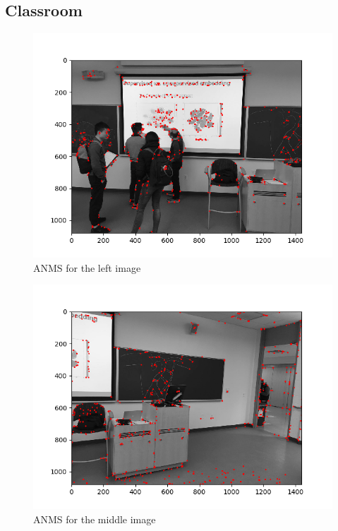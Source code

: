 \documentclass[10pt]{article}
\begin{document}
	\subsection{Classroom}
		\begin{figure}[h]
			\caption{ANMS for the left image}
			\centering
			\includegraphics{img/anmsL.png}
		\end{figure}
		
		\begin{figure}[h]
			\caption{ANMS for the middle image}
			\centering
			\includegraphics{img/anmsM.png}
		\end{figure}
\end{document}
